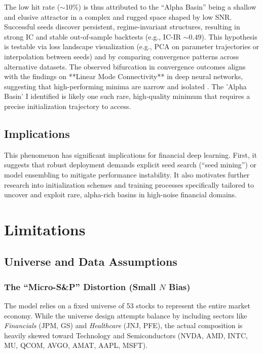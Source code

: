 \documentclass[twoside,final]{hcmut-report}
\begin{document}
The low hit rate ($\sim$10\%) is thus attributed to the ``Alpha Basin'' being a shallow and elusive attractor in a complex and rugged space shaped by low SNR. Successful seeds discover persistent, regime-invariant structures, resulting in strong IC and stable out-of-sample backtests (e.g., IC-IR $\sim0.49$). This hypothesis is testable via loss landscape visualization (e.g., PCA on parameter trajectories or interpolation between seeds) and by comparing convergence patterns across alternative datasets. The observed bifurcation in convergence outcomes aligns with the findings on **Linear Mode Connectivity** in deep neural networks, suggesting that high-performing minima are narrow and isolated \cite{frankle2020linear}. The 'Alpha Basin' I identified is likely one such rare, high-quality minimum that requires a precise initialization trajectory to access.

\subsection{Implications}

This phenomenon has significant implications for financial deep learning. First, it suggests that robust deployment demands explicit seed search (``seed mining'') or model ensembling to mitigate performance instability. It also motivates further research into initialization schemes and training processes specifically tailored to uncover and exploit rare, alpha-rich basins in high-noise financial domains.

\section{Limitations}
\subsection{Universe and Data Assumptions}
\subsubsection{The ``Micro-S\&P'' Distortion (Small $N$ Bias)}
The model relies on a fixed universe of 53 stocks to represent the entire market economy. While the universe design attempts balance by including sectors like \textit{Financials} (JPM, GS) and \textit{Healthcare} (JNJ, PFE), the actual composition is heavily skewed toward Technology and Semiconductors (NVDA, AMD, INTC, MU, QCOM, AVGO, AMAT, AAPL, MSFT).
\end{document}
